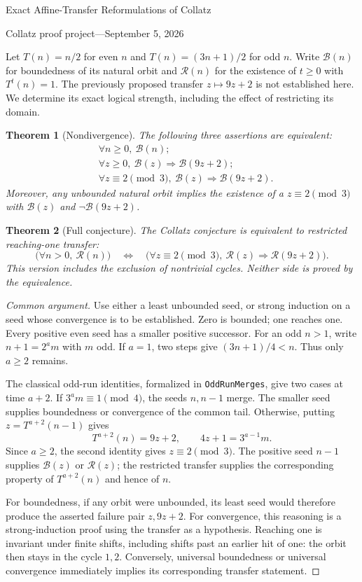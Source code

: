 \documentclass[10pt]{article}
\newtheorem{theorem}{Theorem}
\newcommand{\B}{\mathcal B}
\newcommand{\R}{\mathcal R}
\begin{document}
\begin{center}
{\Large Exact Affine-Transfer Reformulations of Collatz}\par\medskip
Collatz proof project\quad---\quad September 5, 2026
\end{center}
Let $T(n)=n/2$ for even $n$ and $T(n)=(3n+1)/2$ for odd $n$.
Write $\B(n)$ for boundedness of its natural orbit and $\R(n)$ for
the existence of $t\geq0$ with $T^t(n)=1$. The previously proposed
transfer $z\mapsto9z+2$ is not established here. We determine its exact
logical strength, including the effect of restricting its domain.

\begin{theorem}[Nondivergence]
The following three assertions are equivalent:
\begin{align*}
&\forall n\geq0,\ \B(n);\\
&\forall z\geq0,\ \B(z)\Longrightarrow\B(9z+2);\\
&\forall z\equiv2\pmod3,\ \B(z)\Longrightarrow\B(9z+2).
\end{align*}
Moreover, any unbounded natural orbit implies the existence of a
$z\equiv2\pmod3$ with $\B(z)$ and $\neg\B(9z+2)$.
\end{theorem}

\begin{theorem}[Full conjecture]
The Collatz conjecture is equivalent to restricted reaching-one transfer:
\[
\bigl(\forall n>0,\ \R(n)\bigr)
\quad\Longleftrightarrow\quad
\bigl(\forall z\equiv2\pmod3,\ \R(z)\Longrightarrow\R(9z+2)\bigr).
\]
This version includes the exclusion of nontrivial cycles. Neither side
is proved by the equivalence.
\end{theorem}

\begin{proof}[Common argument]
Use either a least unbounded seed, or strong induction on a seed whose
convergence is to be established. Zero is bounded; one reaches one.
Every positive even seed has a smaller positive successor. For an odd
$n>1$, write $n+1=2^am$ with $m$ odd. If $a=1$, two steps give
$(3n+1)/4<n$. Thus only $a\geq2$ remains.

The classical odd-run identities, formalized in \texttt{OddRunMerges}, give
two cases at time $a+2$. If $3^am\equiv1\pmod4$, the seeds $n,n-1$
merge. The smaller seed supplies boundedness or convergence of the
common tail. Otherwise, putting $z=T^{a+2}(n-1)$ gives
\[
 T^{a+2}(n)=9z+2,\qquad 4z+1=3^{a-1}m.
\]
Since $a\geq2$, the second identity gives $z\equiv2\pmod3$.
The positive seed $n-1$ supplies $\B(z)$ or $\R(z)$; the restricted
transfer supplies the corresponding property of $T^{a+2}(n)$ and
hence of $n$.

For boundedness, if any orbit were unbounded, its least seed would
therefore produce the asserted failure pair $z,9z+2$. For convergence,
this reasoning is a strong-induction proof using the transfer as a
hypothesis. Reaching one is invariant under finite shifts, including
shifts past an earlier hit of one: the orbit then stays in the cycle
$1,2$. Conversely, universal boundedness or universal convergence
immediately implies its corresponding transfer statement.
\end{proof}
\end{document}
